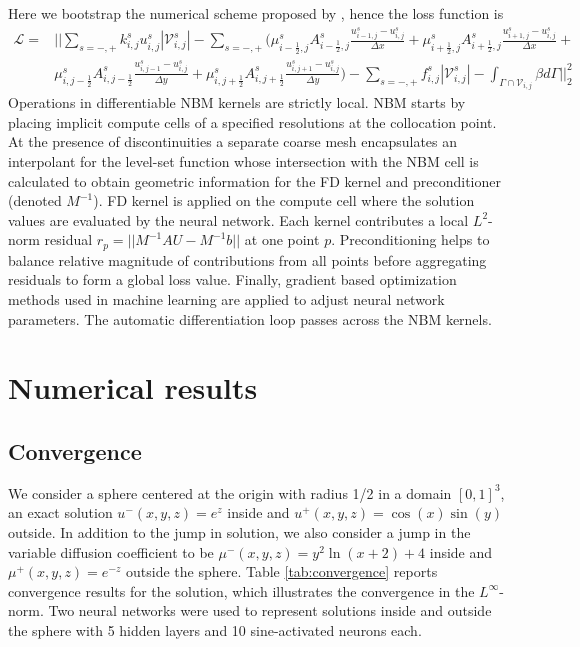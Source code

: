 \documentclass{article}
\begin{document}
Here we bootstrap the numerical scheme proposed by \cite{BOCHKOV2020109269}, hence the loss function is 
\begin{align*}
\mathcal{L} = & \bigg\vert\bigg\vert \sum_{s=-,+} k_{i,j}^s u_{i,j}^{s} |\mathcal{V}_{i,j}^s| - \sum_{s=-,+}\bigg( \mu_{i-\frac{1}{2},j}^s A_{i-\frac{1}{2},j}^s\frac{u_{i-1,j}^s - u_{i,j}^s}{\Delta x}     +   \mu_{i+\frac{1}{2},j}^s A_{i+\frac{1}{2},j}^s\frac{u_{i+1,j}^s - u_{i,j}^s}{\Delta x} +                                                          \\
	 & \mu_{i, j-\frac{1}{2}}^s A_{i, j-\frac{1}{2}}^s\frac{u_{i,j-1}^s - u_{i,j}^s}{\Delta y} + \mu_{i, j+\frac{1}{2}}^s A_{i, j+\frac{1}{2}}^s\frac{u_{i,j+1}^s - u_{i,j}^s}{\Delta y} \bigg)  -  \sum_{s=-,+} f_{i,j}^{s} |\mathcal{V}_{i,j}^s| - \int_{\Gamma\cap \mathcal{V}_{i,j}} \beta d\Gamma \bigg\vert\bigg\vert_2^2
\end{align*}
Operations in differentiable NBM kernels are strictly local. NBM starts by placing implicit compute cells of a specified resolutions at the collocation point. At the presence of discontinuities a separate coarse mesh encapsulates an interpolant for the level-set function whose intersection with the NBM cell is calculated to obtain geometric information for the FD kernel and preconditioner (denoted $M^{-1}$). FD kernel is applied on the compute cell where the solution values are evaluated by the neural network. Each kernel contributes a local $L^2$-norm residual $r_p = ||M^{-1}A U - M^{-1}b||$ at one point $p$. Preconditioning helps to balance relative magnitude of contributions from all points before aggregating residuals to form a global loss value. Finally, gradient based optimization methods used in machine learning are applied to adjust neural network parameters. The automatic differentiation loop passes across the NBM kernels.








\section{Numerical results}
\subsection{Convergence}

We consider a sphere centered at the origin with radius 1/2 in a domain $[0, 1]^3$, an exact solution $u^-(x,y,z)=e^{z}$ inside and $u^+(x,y,z)=\cos(x)\sin(y)$ outside. In addition to the jump in solution, we also consider a jump in the variable diffusion coefficient to be $\mu^-(x,y,z)=y^2 \ln(x+2) + 4$ inside and $\mu^+(x,y,z)=e^{-z}$ outside the sphere. Table \ref{tab:convergence} reports convergence results for the solution, which illustrates the convergence in the $L^\infty$-norm. Two neural networks were used to represent solutions inside and outside the sphere with 5 hidden layers and 10 sine-activated neurons each.
\end{document}
